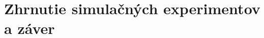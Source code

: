 \documentclass[a4paper, 11pt]{article}
\begin{document}
\pagebreak
\section{Zhrnutie simulačných experimentov a záver}



\clearpage

\renewcommand{\refname}{Literatúra}

\end{document}
